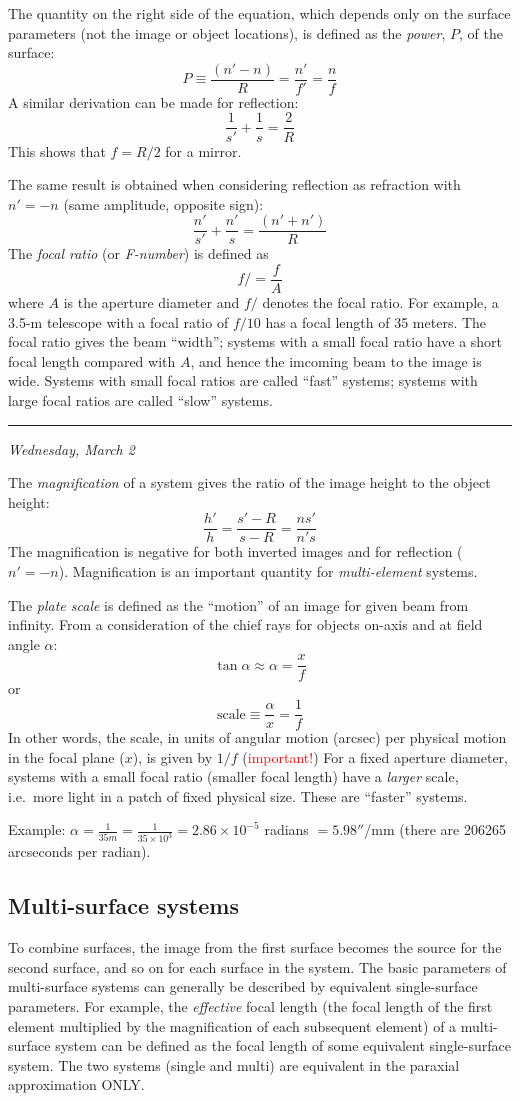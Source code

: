 \documentclass[12pt]{article}
\newcommand{\mydate}[1]{
    \begin{flushright}
        \rule{\textwidth}{0.4pt} %
        \footnotesize\hfill\textit{#1}
    \end{flushright}}
\begin{document}
The quantity on the right side of the equation, which depends only on the
surface parameters (not the image or object locations), is defined as the
\textit{power}, $P$, of the surface:
\[
     P \equiv \frac{(n'-n)}{R} = \frac{n'}{f'} = \frac{n}{f}
    \]
A similar derivation can be made for reflection:
\[
     \frac{1}{s'} + \frac{1}{s} = \frac{2}{R}
    \]
This shows that $f = R/2$ for a mirror.

The same result is obtained when considering reflection as refraction with $n'
= -n$ (same amplitude, opposite sign):
\[
    \frac{n'}{s'}+\frac{n'}{s} = \frac{(n'+n')}{R}
    \]
The \textit{focal ratio} (or \textit{F-number}) is defined as
\[
    f/ = \frac{f}{A}
    \]
where $A$ is the aperture diameter and $f/$ denotes the focal ratio. For
example, a 3.5-m telescope with a focal ratio of $f /10$ has a focal length of
35 meters. The focal ratio gives the beam ``width''; systems with a small focal
ratio have a short focal length compared with $A$, and hence the imcoming beam
to the image is wide. Systems with small focal ratios are called ``fast''
systems; systems with large focal ratios are called ``slow'' systems.

\mydate{Wednesday, March 2}

The \textit{magnification} of a system gives the ratio of the image height to
the object height:
\[
    \frac{h'}{h} = \frac{s'-R}{s-R} = \frac{ns'}{n's}
    \]
The magnification is negative for both inverted images and for reflection
($n' = -n$). Magnification is an important quantity for
\textit{multi-element} systems.

The \textit{plate scale} is defined as the ``motion'' of an image for given
beam from infinity. From a consideration of the chief rays for objects on-axis
and at field angle $\alpha$:
\[
    \tan{\alpha} \approx \alpha = \frac{x}{f}
    \]
or
\[
    \textrm{scale} \equiv \frac{\alpha}{x} = \frac{1}{f}
    \]
In other words, the scale, in units of angular motion (arcsec) per physical
motion in the focal plane ($x$), is given by $1/f$
(\textcolor{red}{important!}) For a fixed aperture diameter, systems with a
small focal ratio (smaller focal length) have a \emph{larger} scale, i.e.\ more
light in a patch of fixed physical size. These are ``faster'' systems.

Example:
$\alpha = \frac{1}{35m} = \frac{1}{35\times10^{3}} = 2.86\times10^{-5}$
radians $ = 5.98''$/mm (there are 206265 arcseconds per radian).

\subsection{Multi-surface systems}
To combine surfaces, the image from the first surface becomes the source for
the second surface, and so on for each surface in the system. The basic
parameters of multi-surface systems can generally be described by equivalent
single-surface parameters. For example, the \textit{effective} focal length
(the focal length of the first element multiplied by the magnification of each
subsequent element) of a multi-surface system can be defined as the focal
length of some equivalent single-surface system. The two systems (single and
multi) are equivalent in the paraxial approximation ONLY\@.
\end{document}
